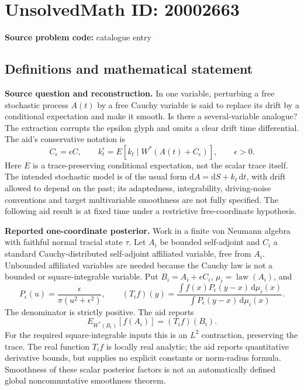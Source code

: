 \documentclass[11pt]{article}
\begin{document}
\section*{UnsolvedMath ID: 20002663}
\textbf{Source problem code:} catalogue entry
\subsection{Definitions and mathematical statement}
\textbf{Source question and reconstruction.} In one variable, perturbing a free stochastic process \(A(t)\) by a free Cauchy variable is said to replace its drift by a conditional expectation and make it smooth. Is there a several-variable analogue? The extraction corrupts the epsilon glyph and omits a clear drift time differential. The aid's conservative notation is
\[
 C_\epsilon=\epsilon C,\qquad
 k_t^\epsilon=E[k_t\mid W^*(A(t)+C_\epsilon)],\qquad\epsilon>0.
\]
Here \(E\) is a trace-preserving conditional expectation, not the scalar trace itself. The intended stochastic model is of the usual form \(\mathrm dA=\mathrm dS+k_t\,\mathrm dt\), with drift allowed to depend on the past; its adaptedness, integrability, driving-noise conventions and target multivariable smoothness are not fully specified. The following aid result is at fixed time under a restrictive free-coordinate hypothesis.

\textbf{Reported one-coordinate posterior.} Work in a finite von Neumann algebra with faithful normal tracial state \(\tau\). Let \(A_i\) be bounded self-adjoint and \(C_i\) a standard Cauchy-distributed self-adjoint affiliated variable, free from \(A_i\). Unbounded affiliated variables are needed because the Cauchy law is not a bounded or square-integrable variable. Put \(B_i=A_i+\epsilon C_i\), \(\mu_i=\operatorname{law}(A_i)\), and
\[
 P_\epsilon(u)=\frac{\epsilon}{\pi(u^2+\epsilon^2)},\qquad
 (T_i f)(y)=
 \frac{\int f(x)P_\epsilon(y-x)\,\mathrm d\mu_i(x)}
      {\int P_\epsilon(y-x)\,\mathrm d\mu_i(x)}.
\]
The denominator is strictly positive. The aid reports
\[
 E_{W^*(B_i)}[f(A_i)]=(T_i f)(B_i).
\]
For the required square-integrable inputs this is an \(L^2\) contraction, preserving the trace. The real function \(T_if\) is locally real analytic; the aid reports quantitative derivative bounds, but supplies no explicit constants or norm-radius formula. Smoothness of these scalar posterior factors is not an automatically defined global noncommutative smoothness theorem.
\end{document}
